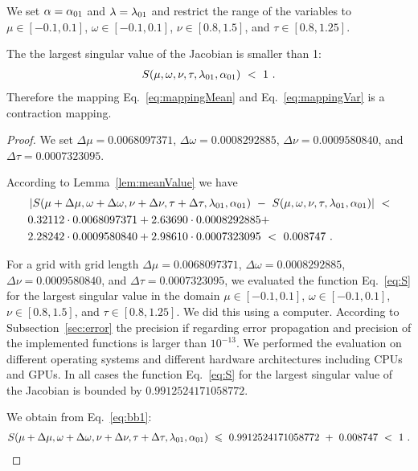 \documentclass{article}
\renewcommand{\leq}{\leqslant}
\begin{document}
\begin{lemma}
\label{lem:sBound}
We set
$\alpha = \alpha_{\rm 01}$ and $\lambda=\lambda_{\rm 01}$ and
restrict the range of the variables to
$\mu \in [-0.1,0.1]$,
$\omega \in[-0.1,0.1]$,
$\nu \in [0.8,1.5]$, and
$\tau \in [0.8,1.25]$.

The the largest singular value of the Jacobian is smaller than 1:
\begin{align}
S(\mu,\omega,\nu,\tau,\lambda_{\rm 01},\alpha_{\rm 01}) \ < \ 1 \ .
\end{align}
Therefore the mapping  Eq.~\eqref{eq:mappingMean} 
and Eq.~\eqref{eq:mappingVar} is a contraction mapping.
\end{lemma}
\begin{proof}
We set 
$\Delta \mu=0.0068097371$,
$\Delta \omega=0.0008292885$,
$\Delta \nu=0.0009580840$, and
$\Delta \tau=0.0007323095$.





According to Lemma~\ref{lem:meanValue} we have
\begin{align}
\label{eq:bb1}
&\left|S(\mu + \Delta \mu,\omega + \Delta \omega,\nu + \Delta
  \nu,\tau + \Delta \tau,\lambda_{\rm 01},\alpha_{\rm 01}) 
\ - \ 
S(\mu,\omega,\nu,\tau,\lambda_{\rm 01},\alpha_{\rm 01}) \right|
\ < \\ \nonumber
&0.32112 \cdot 0.0068097371 + 2.63690 \cdot 0.0008292885 + \\ \nonumber
& 2.28242 \cdot 0.0009580840 + 2.98610 \cdot 0.0007323095\ < \ 0.008747 \ .
\end{align}


For a grid with grid length
$\Delta \mu=0.0068097371$,
$\Delta \omega=0.0008292885$,
$\Delta \nu=0.0009580840$, and
$\Delta \tau=0.0007323095$,
we evaluated the function  Eq.~\eqref{eq:S} 
for the largest singular value
in the domain
$\mu \in [-0.1,0.1]$,
$\omega \in [-0.1,0.1]$,
$\nu \in [0.8,1.5]$, and
$\tau \in [0.8,1.25]$.
We did this using a computer.
According to Subsection~\ref{sec:error}
the precision if regarding error propagation
and precision of the implemented functions is larger than
$10^{-13}$.
We performed the evaluation on different operating systems and
different hardware architectures including CPUs and GPUs.
In all cases the function  Eq.~\eqref{eq:S} for the largest singular
value of the Jacobian is bounded by $0.9912524171058772$.

We obtain from Eq.~\eqref{eq:bb1}:
\begin{align}
S(\mu + \Delta \mu,\omega + \Delta \omega,\nu + \Delta
  \nu,\tau + \Delta \tau,\lambda_{\rm 01},\alpha_{\rm 01})
\ \leq \ 0.9912524171058772 \ + \ 0.008747 \ < \ 1 \ .
\end{align}
\end{proof}
\end{document}
